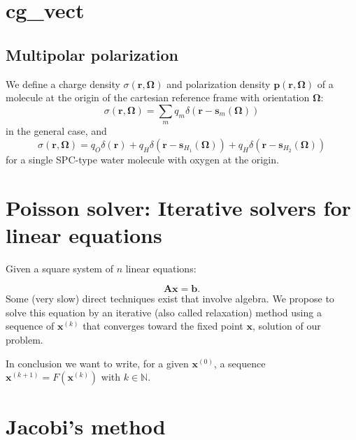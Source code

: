 \section{cg\_vect}


\subsection{Multipolar polarization}

We define a charge density $\sigma\left(\bm{r},\bm{\Omega}\right)$
and polarization density $\bm{p}\left(\bm{r},\bm{\Omega}\right)$
of a molecule at the origin of the cartesian reference frame with
orientation $\bm{\Omega}$:
\begin{equation}
\sigma\left(\bm{r},\bm{\Omega}\right)=\sum_{m}q_{m}\delta\left(\bm{r}-\bm{s}_{m}\left(\bm{\Omega}\right)\right)
\end{equation}
in the general case, and 
\begin{equation}
\sigma\left(\bm{r},\bm{\Omega}\right)=q_{O}\delta\left(\bm{r}\right)+q_{H}\delta\left(\bm{r}-\bm{s}_{H_{1}}\left(\bm{\Omega}\right)\right)+q_{H}\delta\left(\bm{r}-\bm{s}_{H_{2}}\left(\bm{\Omega}\right)\right)
\end{equation}
for a single SPC-type water molecule with oxygen at the origin.


\section{Poisson solver: Iterative solvers for linear equations}

Given a square system of $n$ linear equations:

\begin{equation}
\bm{A}\bm{x}=\bm{b}.\label{eq:linsys}
\end{equation}
Some (very slow) direct techniques exist that involve algebra. We
propose to solve this equation by an iterative (also called relaxation)
method using a sequence of $\bm{x}^{\left(k\right)}$ that
converges toward the fixed point $\bm{x}$, solution of our problem.

In conclusion we want to write, for a given $\bm{x}^{\left(0\right)}$,
a sequence $\bm{x}^{\left(k+1\right)}=F\left(\bm{x}^{\left(k\right)}\right)$
with $k\in\mathbb{N}$.


\section{Jacobi's method}

